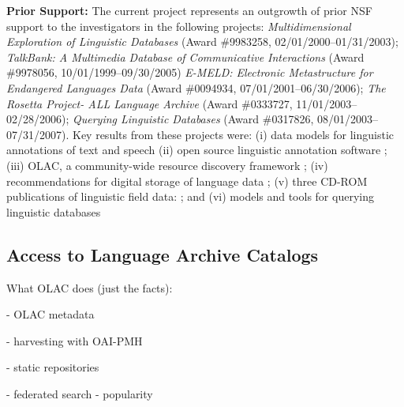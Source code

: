 
\vspace{1in}

\textbf{Prior Support:} The current project represents an outgrowth of
prior NSF support to the investigators in the following projects:
\textit{Multidimensional Exploration of Linguistic Databases}
  (Award \#9983258, 02/01/2000--01/31/2003);
\textit{TalkBank: A Multimedia Database of Communicative Interactions}
  (Award \#9978056, 10/01/1999--09/30/2005)
\textit{E-MELD: Electronic Metastructure for Endangered Languages Data}
  (Award \#0094934, 07/01/2001--06/30/2006);
\textit{The Rosetta Project- ALL Language Archive}
  (Award \#0333727, 11/01/2003--02/28/2006);
\textit{Querying Linguistic Databases}
  (Award \#0317826, 08/01/2003--07/31/2007).
Key results from these projects were:
(i) data models for linguistic annotations of text and speech
\citep{BirdLiberman01,MaedaBird00,GraffBird00,CottonBird02,CieriBird01,ATLAS00,BirdHarrington01}
(ii) open source linguistic annotation software
\citep{Bird01acl,MaedaBird02,BirdMaeda02,MaLee02};
(iii) OLAC, a community-wide resource discovery framework
\citep{BirdSimons00,BirdSimons00survey,BirdSimons01,BirdSimons02workshop,Simons02query,SimonsBird03lht,BirdSimons03chum,Simons03display,SimonsBird03llc,BirdSimons04metadata};
(iv) recommendations for digital storage of language data
\citep{BirdSimons03language};
(v) three CD-ROM publications of linguistic field data:
\citep{BirdBell01,Bird03paradigms,Bird03ngomba};
and
(vi) models and tools for querying linguistic databases
\citep{BirdBuneman01,BirdBunemanTan00,LaiBird04,Bird05planx,Bird06icde}




\subsection{Access to Language Archive Catalogs}

What OLAC does (just the facts):

- OLAC metadata \citep{BirdSimons04metadata}

- harvesting with OAI-PMH \citep{SimonsBird03lht}

- static repositories

- federated search \citep{HughesKamat05}
  - popularity \citep{Hughes6lrec}

